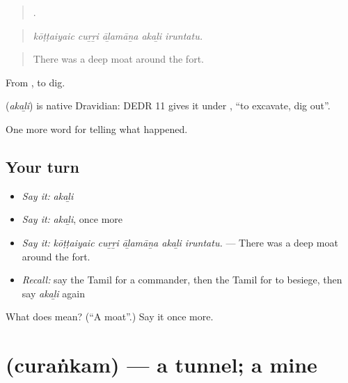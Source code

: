 \begin{quote}
    .
\end{quote}

\begin{quote}
\emph{kōṭṭaiyaic cuṟṟi āḻamāṉa akaḻi iruntatu.}
\end{quote}

\begin{quote}
There was a deep moat around the fort.
\end{quote}

From , to dig.

\begin{cousinweb}
\textbf{} (\emph{akaḻi}) is native Dravidian: DEDR 11 gives it under , \textquotedblleft{}to excavate, dig out\textquotedblright{}.
\end{cousinweb}

\begin{grammarlens}[title={What you've built}]
One more word for telling what happened.
\end{grammarlens}

\subsection*{Your turn}
\begin{itemize}
\raggedright
  \item \emph{Say it:} \emph{akaḻi}
  \item \emph{Say it:} \emph{akaḻi}, once more
  \item \emph{Say it:} \emph{kōṭṭaiyaic cuṟṟi āḻamāṉa akaḻi iruntatu.} — There was a deep moat around the fort.
  \item \emph{Recall:} say the Tamil for a commander, then the Tamil for to besiege, then say \emph{akaḻi} again
\end{itemize}

\begin{tcolorbox}[breakable,colback=teal!4,colframe=teal!35!black,title={Before you move on}]
What does  mean? (\textquotedblleft{}A moat\textquotedblright{}.) Say it once more.
\end{tcolorbox}
\section[\texorpdfstring{\ta{சுரங்கம்} (curaṅkam)}{சுரங்கம் (curaṅkam)}]{ (curaṅkam) — a tunnel; a mine}

